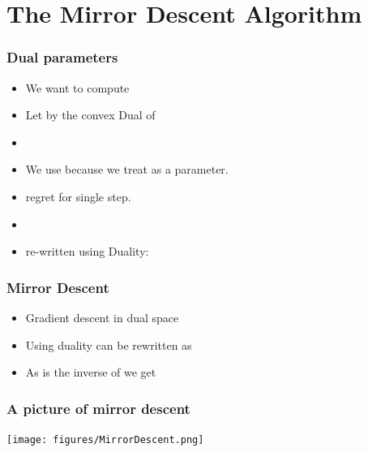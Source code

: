\documentclass[handout]{beamer}
\begin{document}
\section{The Mirror Descent Algorithm}

\begin{frame}
  \frametitle{Dual parameters}
  \begin{itemize}
  \item We want to compute
  \item Let \R{$\Phi^*$} by the convex Dual of \R{$\Phi$}
  \item {}
    \item We use  because we treat  as a parameter.
  \item {} regret for single step.
  \item {}
  \item re-written using Duality:
  \end{itemize}
\end{frame}

\begin{frame}
  \frametitle{Mirror Descent}
  \begin{itemize}
  \item Gradient descent in dual space
  \item Using duality can be rewritten as
  \item As \R{$\nabla \Phi$} is the inverse of \R{$\nabla \Phi^*$} we get
  \end{itemize}
\end{frame}

\begin{frame}
  \frametitle{A picture of mirror descent}
\texttt{[image: figures/MirrorDescent.png]}
\end{frame}
\end{document}
